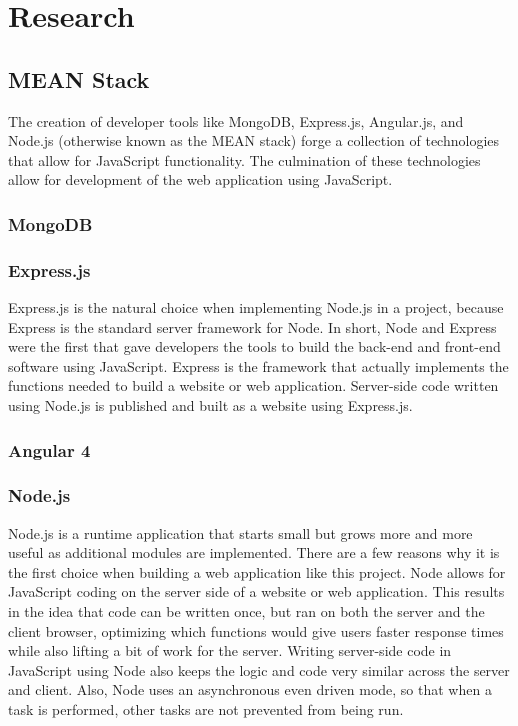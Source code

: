 \documentclass[12pt,a4paper]{report}
\begin{document}
\newpage
\chapter*{Research}
	\section{MEAN Stack}
	The creation of developer tools like MongoDB, Express.js, Angular.js, and Node.js (otherwise known as the MEAN stack) forge a collection of technologies that allow for JavaScript functionality. The culmination of these technologies allow for development of the web application using JavaScript.
		\subsection{MongoDB}
		\subsection{Express.js}
		Express.js is the natural choice when implementing Node.js in a project, because Express is the standard server framework for Node. In short, Node and Express were the first that gave developers the tools to build the back-end and front-end software using JavaScript. Express is the framework that actually implements the functions needed to build a website or web application. Server-side code written using Node.js is published and built as a website using Express.js.
		\subsection{Angular 4}
		\subsection{Node.js}
		Node.js is a runtime application that starts small but grows more and more useful as additional modules are implemented. There are a few reasons why it is the first choice when building a web application like this project. Node allows for JavaScript coding on the server side of a website or web application. This results in the idea that code can be written once, but ran on both the server and the client browser, optimizing which functions would give users faster response times while also lifting a bit of work for the server. Writing server-side code in JavaScript using Node also keeps the logic and code very similar across the server and client. Also, Node uses an asynchronous even driven mode, so that when a task is performed, other tasks are not prevented from being run.
		
\end{document}
